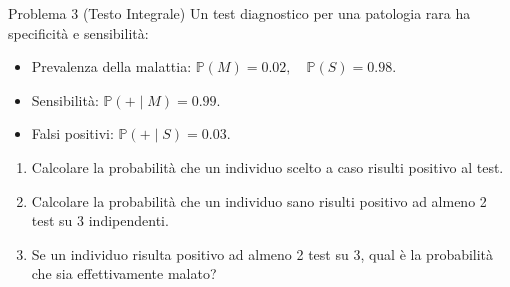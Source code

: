 \documentclass[11pt,a4paper]{article}
\newcommand{\Prob}{\mathbb{P}}
\begin{document}
\begin{problemabox}{Problema 3 (Testo Integrale)}
Un test diagnostico per una patologia rara ha specificità e sensibilità:
\begin{itemize}
    \item Prevalenza della malattia: $\Prob(M) = 0.02, \quad \Prob(S) = 0.98$.
    \item Sensibilità: $\Prob(+ \mid M) = 0.99$.
    \item Falsi positivi: $\Prob(+ \mid S) = 0.03$.
\end{itemize}
\begin{enumerate}[label=(\alph*)]
    \item Calcolare la probabilità che un individuo scelto a caso risulti positivo al test.
    \item Calcolare la probabilità che un individuo sano risulti positivo ad almeno 2 test su 3 indipendenti.
    \item Se un individuo risulta positivo ad almeno 2 test su 3, qual è la probabilità che sia effettivamente malato?
\end{enumerate}
\end{problemabox}
\end{document}
